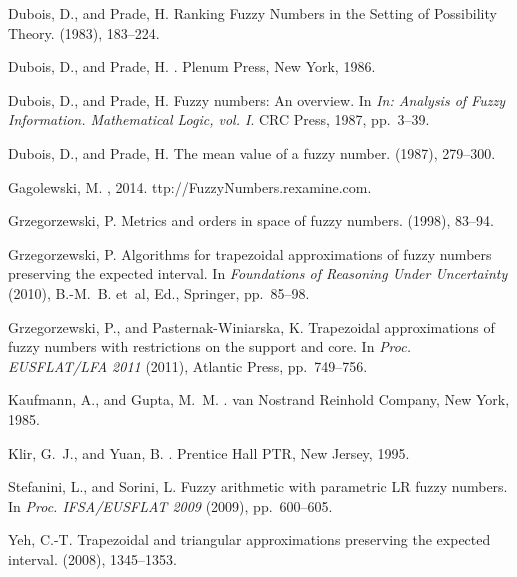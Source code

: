 \documentclass[11pt]{article}\usepackage[]{graphicx}\usepackage[]{color}
\begin{document}
\begin{thebibliography}{10}
{\sc Dubois, D., and Prade, H.}
\newblock Ranking Fuzzy Numbers in the Setting of Possibility Theory.
 (1983), 183--224.

{\sc Dubois, D., and Prade, H.}
.
\newblock Plenum Press, New York, 1986.

{\sc Dubois, D., and Prade, H.}
\newblock Fuzzy numbers: An overview.
\newblock In {\em In: Analysis of Fuzzy Information. Mathematical Logic, vol.
  I}. CRC Press, 1987, pp.~3--39.

{\sc Dubois, D., and Prade, H.}
\newblock The mean value of a fuzzy number.
 (1987), 279--300.

{\sc Gagolewski, M.}
, 2014.
ttp://FuzzyNumbers.rexamine.com.

{\sc Grzegorzewski, P.}
\newblock Metrics and orders in space of fuzzy numbers.
 (1998), 83--94.

{\sc Grzegorzewski, P.}
\newblock Algorithms for trapezoidal approximations of fuzzy numbers preserving
  the expected interval.
\newblock In {\em Foundations of Reasoning Under Uncertainty\/} (2010),
  B.-M.~B. et~al, Ed., Springer, pp.~85--98.

{\sc Grzegorzewski, P., and Pasternak-Winiarska, K.}
\newblock Trapezoidal approximations of fuzzy numbers with restrictions on the
  support and core.
\newblock In {\em Proc. EUSFLAT/LFA 2011\/} (2011), Atlantic Press,
  pp.~749--756.

{\sc Kaufmann, A., and Gupta, M.~M.}
.
\newblock van Nostrand Reinhold Company, New York, 1985.

{\sc Klir, G.~J., and Yuan, B.}
.
\newblock Prentice Hall PTR, New Jersey, 1995.

{\sc Stefanini, L., and Sorini, L.}
\newblock Fuzzy arithmetic with parametric {LR} fuzzy numbers.
\newblock In {\em Proc. IFSA/EUSFLAT 2009\/} (2009), pp.~600--605.

{\sc Yeh, C.-T.}
\newblock Trapezoidal and triangular approximations preserving the expected
  interval.
 (2008), 1345--1353.

\end{thebibliography}
\end{document}
